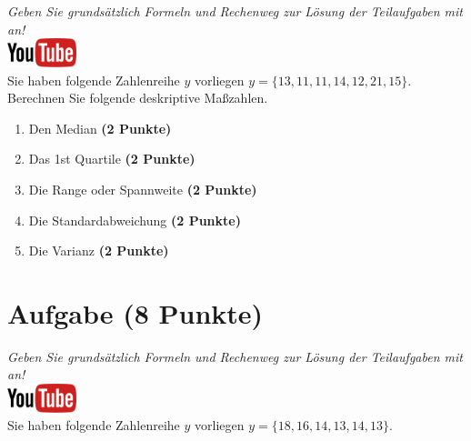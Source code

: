\documentclass[a4paper, 10pt]{scrartcl}\usepackage[]{graphicx}\usepackage[]{xcolor}
\begin{document}
\textit{Geben Sie grunds{\"a}tzlich Formeln und Rechenweg zur L{\"o}sung der
  Teilaufgaben mit an!} \\[1Ex]

\hfill\href{https://youtu.be/sBlSc_eJbnw}{\includegraphics[width =
  2cm]{img/youtube}}\\[1Ex]


Sie haben folgende Zahlenreihe $y$ vorliegen
$y = \{13, 11, 11, 14, 12, 21, 15\}$. Berechnen Sie folgende
deskriptive Ma{\ss}zahlen. 



\begin{enumerate}
\item Den Median \textbf{(2 Punkte)}
\item Das 1st Quartile \textbf{(2 Punkte)}
\item Die Range oder Spannweite \textbf{(2 Punkte)}
\item Die Standardabweichung \textbf{(2 Punkte)}
\item Die Varianz \textbf{(2 Punkte)}
\end{enumerate}
 
\clearpage

\section{Aufgabe \hfill (8 Punkte)}

\textit{Geben Sie grunds{\"a}tzlich Formeln und Rechenweg zur L{\"o}sung der
  Teilaufgaben mit an!} \\[1Ex]

\hfill\href{https://youtu.be/oMdtYbDInYE}{\includegraphics[width =
  2cm]{img/youtube}}\\[1Ex]

Sie haben folgende Zahlenreihe $y$ vorliegen
$y = \{18, 16, 14, 13, 14, 13\}$.
\end{document}
